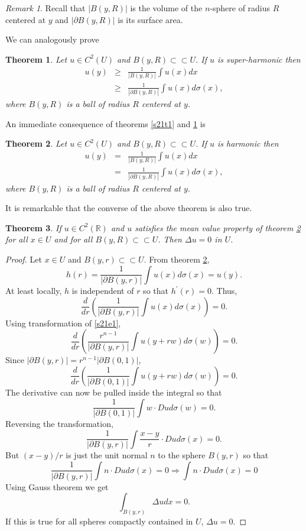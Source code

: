 \documentclass{article}
\newcommand{\cce}{\subset\subset}
\theoremstyle{plain}
\newtheorem{thm}{Theorem}
\numberwithin{thm}{section}
\theoremstyle{plain}
\numberwithin{prop}{section}
\theoremstyle{definition}
\numberwithin{defn}{section}
\theoremstyle{remark}
\newtheorem*{rem}{Remark}
\numberwithin{equation}{section}
\begin{document}
\begin{rem}
Recall that $|B(y, R)|$ is the volume of the $n$-sphere of radius $R$ centered at $y$ and $|\partial B(y, R)|$ is 
its surface area.
\end{rem}

We can analogously prove 
\begin{thm}\label{s21t2}
Let $u \in C^2(U)$ and $B(y, R) \cce U$. If $u$ is super-harmonic then
\begin{eqnarray*}
u(y) &\ge& \frac{1}{|B(y, R)|}\int u(x)dx \\
 &\ge& \frac{1}{|\partial B(y, R)|}\int u(x)d\sigma(x),
\end{eqnarray*}
where $B(y, R)$ is a ball of radius $R$ centered at $y$.
\end{thm}

An immediate consequence of theorems \ref{s21t1} and \ref{s21t2} is
\begin{thm}\label{s21t3}
Let $u \in C^2(U)$ and $B(y, R) \cce U$. If $u$ is harmonic then
\begin{eqnarray*}
u(y) &=& \frac{1}{|B(y, R)|}\int u(x)dx \\
 &=& \frac{1}{|\partial B(y, R)|}\int u(x)d\sigma(x),
\end{eqnarray*}
where $B(y, R)$ is a ball of radius $R$ centered at $y$.
\end{thm}

It is remarkable that the converse of the above theorem is also true.
\begin{thm}\label{s21t4}
If $u \in C^2(\mathbb{R})$ and $u$ satisfies the mean value property of theorem \ref{s21t3} for all $x \in U$
and for all $B(y, R) \cce U$. Then $\Delta u = 0$ in $U$.
\end{thm}
\begin{proof}
Let $x \in U$ and $B(y,r) \cce U$. From theorem \ref{s21t3},
\[
h(r) = \frac{1}{|\partial B(y,r)|}\int u(x)d\sigma(x) = u(y).
\]
At least locally, $h$ is independent of $r$ so that $h^\prime(r) = 0$. Thus,
\[
\frac{d}{dr}\left(\frac{1}{|\partial B(y,r)|}\int u(x)d\sigma(x)\right) = 0.
\]
Using transformation of \eqref{s21e1}, 
\[
\frac{d}{dr}\left(\frac{r^{n-1}}{|\partial B(y,r)|}\int u(y + rw)d\sigma(w)\right) = 0.
\]
Since $|\partial B(y,r)| = r^{n-1}|\partial B(0,1)|$,
\[
\frac{d}{dr}\left(\frac{1}{|\partial B(0,1)|}\int u(y + rw)d\sigma(w)\right) = 0.
\]
The derivative can now be pulled inside the integral so that
\[
\frac{1}{|\partial B(0,1)|} \int w\cdot Du d\sigma(w) = 0.
\]
Reversing the transformation,
\[
\frac{1}{|\partial B(y,r)|} \int \frac{x - y}{r}\cdot Du d\sigma(x) = 0.
\]
But $(x - y)/r$ is just the unit normal $n$ to the sphere $B(y,r)$ so that
\[
\frac{1}{|\partial B(y,r)|} \int n\cdot Du d\sigma(x) = 0 \Rightarrow \int n\cdot Du d\sigma(x) = 0
\]
Using Gauss theorem we get
\[
\int_{B(y,r)} \Delta u dx = 0.
\]
If this is true for all spheres compactly contained in $U$, $\Delta u = 0$.
\end{proof}
\end{document}
